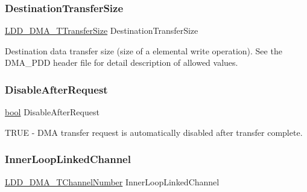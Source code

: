 \subsubsection{\texorpdfstring{Destination\+Transfer\+Size}{DestinationTransferSize}}
{\footnotesize\ttfamily \hyperlink{group___p_e___types__module_ga868f08f9448e5df27a38314f0893d84a}{L\+D\+D\+\_\+\+D\+M\+A\+\_\+\+T\+Transfer\+Size} Destination\+Transfer\+Size}

Destination data transfer size (size of a elemental write operation). See the D\+M\+A\+\_\+\+P\+DD header file for detail description of allowed values. \mbox{\label{struct_l_d_d___d_m_a___t_transfer_descriptor_a1f619ae63672eec01a264b129679f4e3}} 
\subsubsection{\texorpdfstring{Disable\+After\+Request}{DisableAfterRequest}}
{\footnotesize\ttfamily \hyperlink{group___p_e___types__module_ga97a80ca1602ebf2303258971a2c938e2}{bool} Disable\+After\+Request}

T\+R\+UE -\/ D\+MA transfer request is automatically disabled after transfer complete. \mbox{\label{struct_l_d_d___d_m_a___t_transfer_descriptor_a17a799ba61cfc3d0345e4ee82340cc58}} 
\subsubsection{\texorpdfstring{Inner\+Loop\+Linked\+Channel}{InnerLoopLinkedChannel}}
{\footnotesize\ttfamily \hyperlink{group___p_e___types__module_gad268d607015891269cb015faa8bc0dac}{L\+D\+D\+\_\+\+D\+M\+A\+\_\+\+T\+Channel\+Number} Inner\+Loop\+Linked\+Channel}


